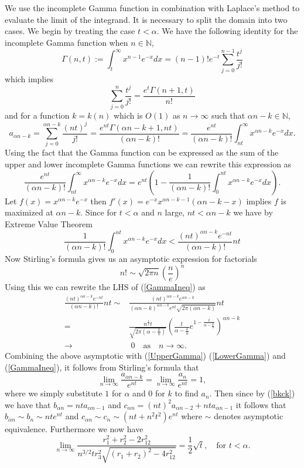 \documentclass[12pt]{amsart}
\theoremstyle{remark}
\begin{document}
We use the incomplete Gamma function in combination with Laplace's method to evaluate the limit of the integrand.  It is necessary to split the domain into two cases. We begin by treating the case $t<\alpha.$ We have the following identity for the incomplete Gamma function when $n\in\mathbb{N}$,
\[\Gamma(n,t):=\int_t^\infty x^{n-1}e^{-x}dx=(n-1)!e^{-t}\sum_{j=0}^{n-1}\frac{t^j}{j!}\]
which implies
\[\sum_{j=0}^n\frac{t^j}{j!}=\frac{e^t\Gamma(n+1,t)}{n!}\]
and for a function $k=k(n)$ which is $O(1)$ as $n\rightarrow \infty$ such that $\alpha n -k\in\mathbb{N}$,
\begin{equation}
	\label{UpperGamma}
	a_{\alpha n-k}=\sum_{j=0}^{\alpha n-k}\frac{(nt)^j}{j!}
	=\frac{e^{nt}\Gamma(\alpha n-k+1,nt)}{(\alpha n-k)!}
	=\frac{e^{nt}}{(\alpha n-k)!}\int_{nt}^\infty x^{\alpha n-k}e^{-x}dx.
\end{equation}
Using the fact that the Gamma function can be expressed as the sum of the upper and lower incomplete Gamma functions we can rewrite this expression as
\begin{equation}
	\label{LowerGamma}
	\frac{e^{nt}}{(\alpha n-k)!}\int_{nt}^\infty x^{\alpha n-k}e^{-x}dx
	=e^{nt}\left(1-\frac{1}{(\alpha n-k)!}\int_0^{nt} x^{\alpha n-k}e^{-x}dx\right).
\end{equation}
Let $f(x)=x^{\alpha n-k}e^{-x}$ then $f'(x)=e^{-x}x^{\alpha n - k - 1}(\alpha n - k - x)$ implies $f$ is maximized at $\alpha n - k$. Since for $t<\alpha$ and $n$ large, $nt < \alpha n - k$ we have by Extreme Value Theorem
\begin{equation}
\label{GammaIneq}
\frac{1}{(\alpha n-k)!}\int_0^{nt} x^{\alpha n-k}e^{-x}dx <
\frac{(nt)^{\alpha n - k}e^{-nt}}{(\alpha n - k)!}nt
\end{equation}
Now Stirling's formula gives us an asymptotic expression for factorials
\[
n!\sim \sqrt{2\pi n}\left(\frac{n}{e}\right)^n
\]
Using this we can rewrite the LHS of (\ref{GammaIneq}) as
\begin{align*}
\frac{(nt)^{\alpha n - k}e^{-nt}}{(\alpha n - k)!}nt \sim
&\frac{(nt)^{\alpha n - k}e^{\alpha n - k}}{(\alpha n - k)^{\alpha n - k}e^{nt}\sqrt{2\pi (\alpha n - k)}}nt
\\=& \frac{n^{\frac{1}{2}}t}{\sqrt{2\pi(\alpha - \frac{k}{n})}}\left(\frac{t}{\alpha - \frac{k}{n}}e^{1 - \frac{t}{\alpha - \frac{k}{n}}}\right)^{\alpha n - k}
\\ \rightarrow& \ 0 \quad\text{as}\quad n\rightarrow\infty.
\end{align*}
Combining the above asymptotic with (\ref{UpperGamma}) (\ref{LowerGamma}) and (\ref{GammaIneq}), it follows from Stirling's formula that
\[\lim_{n\rightarrow\infty}\frac{a_{\alpha n-k}}{e^{nt}}=\lim_{n\rightarrow\infty}\frac{a_{n}}{e^{nt}}=1,\]
where we simply substitute $1$ for $\alpha$ and $0$ for $k$ to find $a_n$.  Then since by (\ref{bkck}) we have that $b_{\alpha n} = nt a_{\alpha n - 1}$ and $c_{\alpha n} = (nt)^2a_{\alpha n - 2} + nt a_{\alpha n - 1}$ it follows that $b_{\alpha n}\sim b_n\sim nte^{nt}$ and $c_{\alpha n}\sim c_n\sim(nt+n^2t^2)e^{nt}$ where $\sim$ denotes asymptotic equivalence. Furthermore we now have
\[\lim_{n\rightarrow\infty}\frac{r_1^2+r_2^2-2r_{12}^2}{n^{3/2}t r_3^2\sqrt{(r_1+r_2)^2-4r_{12}^2}}=\frac{1}{2}\sqrt{t},\quad\text{for $t<\alpha$}.\]
\end{document}
